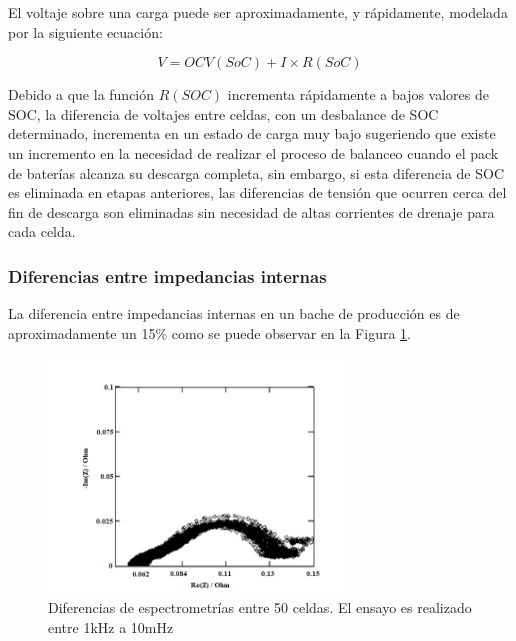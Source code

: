 \documentclass[10pt,a4paper]{article}
\begin{document}
	\noindent El voltaje sobre una carga puede ser aproximadamente, y rápidamente, modelada por la siguiente ecuación:
	
	\begin{equation}
		V = OCV(SoC) + I \times R(SoC)
		\label{v_load_bat}
	\end{equation}
	
	\noindent Debido a que la función $R(SOC)$ incrementa rápidamente a bajos valores de SOC, la diferencia de voltajes entre celdas, con un desbalance de SOC determinado, incrementa en un estado de carga muy bajo sugeriendo que existe un incremento en la necesidad de realizar el proceso de balanceo cuando el pack de baterías alcanza su descarga completa, sin embargo, si esta diferencia de SOC es eliminada en etapas anteriores, las diferencias de tensión que ocurren cerca del fin de descarga son eliminadas sin necesidad de altas corrientes de drenaje para cada celda.
	
	\subsubsection{Diferencias entre impedancias internas}
	
	La diferencia entre impedancias internas en un bache de producción es de aproximadamente un 15\% como se puede observar en la Figura \ref{zin_diff}.
	
	\begin{figure}[h!]
		\begin{center}
			\includegraphics[width=0.7\textwidth]{zin_diff.png}
			\caption{Diferencias de espectrometrías entre 50 celdas. 
                     El ensayo es realizado entre 1kHz a 10mHz}
			\label{zin_diff}
		\end{center}
	\end{figure}
	\FloatBarrier
\end{document}
